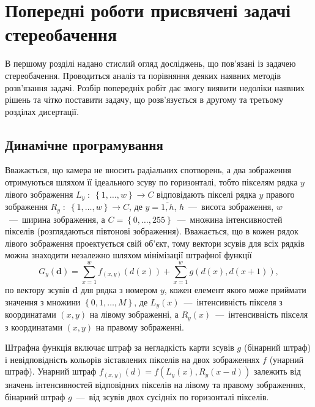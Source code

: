 \chapter{Попередні роботи присвячені задачі стереобачення}

В першому розділі надано стислий огляд досліджень,
що пов'язані із задачею стереобачення.
Проводиться аналіз та порівняння деяких наявних методів розв'язання задачі.
Розбір попередніх робіт дає змогу виявити недоліки
наявних рішень та чітко поставити задачу,
що розв'язується в другому та третьому розділах дисертації.

\section{Динамічне програмування}

Вважається, що камера не вносить радіальних спотворень,
а два зображення отримуються шляхом її ідеального зсуву по горизонталі,
тобто пікселям рядка $y$ лівого зображення
$L_y \; : \; \left\{ 1, \dotsc, w \right\} \to C$
відповідають пікселі рядка $y$
правого зображення $R_y \; : \; \left\{ 1, \dotsc, w \right\} \to C$,
де $y = \overline{1, h}$, $h$~---~висота зображення, $w$~---~ширина зображення,
а $C = \left\{ 0, \dotsc, 255 \right\}$~---~множина інтенсивностей пікселів
(розглядаються півтонові зображення).
Вважається, що в кожен рядок лівого зображення проектується свій об'єкт,
тому вектори зсувів для всіх рядків можна знаходити незалежно шляхом
мінімізації штрафної функції
\begin{equation}\label{eq:overview:energy}
    G_y \left(\pmb{d} \right)
    = \sum \limits_{x = 1}^{w}
        f_{\left( x, y \right)} \left( d \left( x \right) \right)
    + \sum \limits_{x = 1}^{w}
        g \left(d \left(x \right), d \left( x + 1 \right) \right),
\end{equation}
по вектору зсувів $\pmb{d}$ для рядка з номером $y$,
кожен елемент якого може приймати значення з множини
$\left\{ 0, 1, \dotsc, M \right\}$,
де $L_y \left( x \right)$~---~інтенсивність пікселя з координатами
$ \left(x, y \right)$ на лівому зображенні,
а $R_y \left( x \right)$~---~інтенсивність пікселя з координатами
$\left( x, y \right)$ на правому зображенні.

Штрафна функція включає штраф за негладкість карти зсувів $g$ (бінарний штраф)
і невідповідність кольорів зіставлених пікселів на двох зображеннях $f$
(унарний штраф).
Унарний штраф
$f_{\left( x, y \right)} \left( d \right) = f \left(
    L_y \left(x \right),
    R_y \left( x - d \right)
\right)$ залежить від значень
інтенсивностей відповідних пікселів на лівому та правому зображеннях,
бінарний штраф $g$~---~від зсувів двох сусідніх по горизонталі пікселів.


